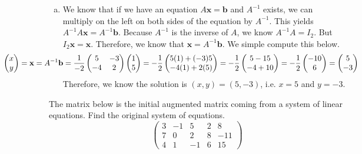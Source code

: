 \documentclass[12pt,letterpaper]{exam}
\begin{document}
\begin{questions}
\begin{enumerate}[(a)]
\item We know that if we have an equation $A\mathbf{x}= \mathbf{b}$ and $A^{-1}$ exists, we can multiply on the left on both sides of the equation by $A^{-1}$. This yields $A^{-1}A\mathbf{x}= A^{-1}\mathbf{b}$. Because $A^{-1}$ is the inverse of $A$, we know $A^{-1}A= I_2$. But $I_2 \mathbf{x}= \mathbf{x}$. Therefore, we know that $\mathbf{x}= A^{-1} \mathbf{b}$. We simple compute this below. 
	\[
	\hspace{-2.75cm} \begin{pmatrix} x \\ y \end{pmatrix}= \mathbf{x}= A^{-1} \mathbf{b}= \dfrac{1}{-2} \begin{pmatrix} 5 & -3 \\ -4 & 2 \end{pmatrix} \begin{pmatrix} 1 \\ 5 \end{pmatrix}= -\dfrac{1}{2} \begin{pmatrix} 5(1) + (-3)5 \\ -4(1) + 2(5) \end{pmatrix}= -\dfrac{1}{2} \begin{pmatrix} 5 - 15 \\ -4 + 10 \end{pmatrix}= -\dfrac{1}{2} \begin{pmatrix} -10 \\ 6 \end{pmatrix}= \begin{pmatrix} 5 \\ -3 \end{pmatrix}
	\]
Therefore, we know the solution is $(x, y)= (5, -3)$, i.e. $x= 5$ and $y= -3$. 
\end{enumerate}



\newpage
\question[10] The matrix below is the initial augmented matrix coming from a system of linear equations. Find the original system of equations. 
	\[
	\begin{pmatrix} 3 & -1 & 5 & 2 & 8 \\ 7 & 0 & 2 & 8 & -11 \\ 4 & 1 & -1 & 6 & 15 \end{pmatrix}
	\] \pspace


\end{questions}
\end{document}
